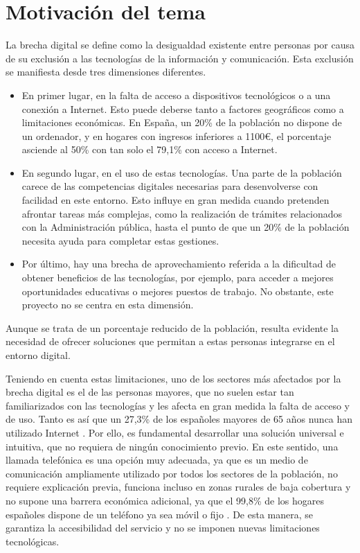 \documentclass[12pt, a4paper, twoside]{report}
\begin{document}
    \section{Motivación del tema}
        La brecha digital se define como la desigualdad existente entre personas por causa de su exclusión a las tecnologías de la información y comunicación. 
        Esta exclusión se manifiesta desde tres dimensiones diferentes.
        \begin{itemize}
            \item En primer lugar, en la falta de acceso a dispositivos tecnológicos o a una conexión a Internet. 
                Esto puede deberse tanto a factores geográficos como a limitaciones económicas. 
                En España, un 20\% de la población no dispone de un ordenador, y en hogares con ingresos inferiores a 1100€, el porcentaje asciende al 50\% con tan solo el 79,1\% con acceso a Internet.
            \item En segundo lugar, en el uso de estas tecnologías. 
                Una parte de la población carece de las competencias digitales necesarias para desenvolverse con facilidad en este entorno. 
                Esto influye en gran medida cuando pretenden afrontar tareas más complejas, como la realización de trámites relacionados con la Administración pública, hasta el punto de que un 20\% de la población necesita ayuda para completar estas gestiones.
            \item Por último, hay una brecha de aprovechamiento referida a la dificultad de obtener beneficios de las tecnologías, por ejemplo, para acceder a mejores oportunidades educativas o mejores puestos de trabajo. 
                No obstante, este proyecto no se centra en esta dimensión.
        \end{itemize}
        Aunque se trata de un porcentaje reducido de la población, resulta evidente la necesidad de ofrecer soluciones que permitan a estas personas integrarse en el entorno digital. \cite{ref1}
    
        Teniendo en cuenta estas limitaciones, uno de los sectores más afectados por la brecha digital es el de las personas mayores, que no suelen estar tan familiarizados con las tecnologías y les afecta en gran medida la falta de acceso y de uso. 
        Tanto es así que un 27,3\% de los españoles mayores de 65 años nunca han utilizado Internet \cite{ref2}. 
        Por ello, es fundamental desarrollar una solución universal e intuitiva, que no requiera de ningún conocimiento previo.
        En este sentido, una llamada telefónica es una opción muy adecuada, ya que es un medio de comunicación ampliamente utilizado por todos los sectores de la población, no requiere explicación previa, funciona incluso en zonas rurales de baja cobertura y no supone una barrera económica adicional, ya que el 99,8\% de los hogares españoles dispone de un teléfono ya sea móvil o fijo \cite{ref3}. 
        De esta manera, se garantiza la accesibilidad del servicio y no se imponen nuevas limitaciones tecnológicas.
\end{document}
